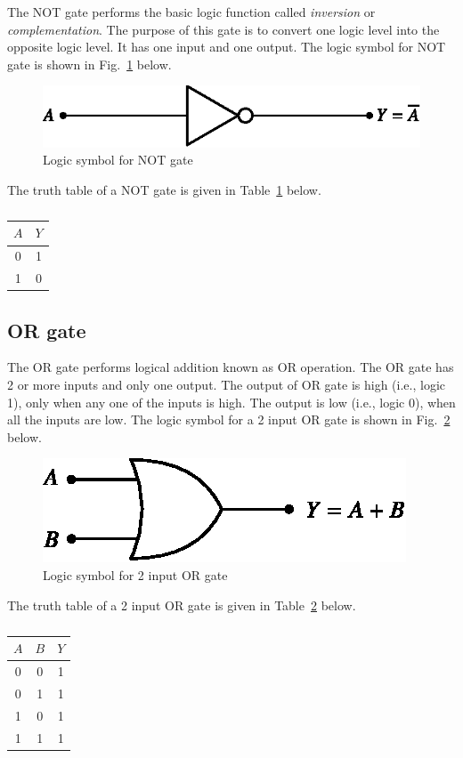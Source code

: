 The NOT gate performs the basic logic function called {\em inversion} or {\em complementation}. The purpose of this gate is to convert one logic level into the opposite logic level. It has one input and one output. The logic symbol for NOT gate is shown in Fig.~\ref{fig5.7} below.
\begin{figure}[H]
\centering
\includegraphics{chap5/fig5.8.eps}
\caption{Logic symbol for NOT gate}\label{fig5.7}
\end{figure}

The truth table of a NOT gate is given in Table~\ref{tab5.10} below.
\begin{table}[H]
\centering
\caption{}\label{tab5.10}
\tabcolsep=10pt
\begin{tabular}{|c|c|}
\hline
\boldmath$A$ & \boldmath$Y$\\
\hline
0 & 1\\
1 & 0\\
\hline
\end{tabular}
\end{table}

\subsection{OR gate}\label{sec5.14.1}

The OR gate performs logical addition known as OR operation. The OR gate has 2 or more inputs and only one output. The output of OR gate is high (i.e., logic 1), only when any one of the inputs is high. The output is low (i.e., logic 0), when all the inputs are low. The logic symbol for a 2 input OR gate is shown in Fig.~\ref{fig5.8} below.
\begin{figure}[H]
\centering
\includegraphics{chap5/fig5.9.eps}
\caption{Logic symbol for 2 input OR gate}\label{fig5.8}
\end{figure}

The truth table of a 2 input OR gate is given in Table~\ref{tab5.11} below.
\begin{table}[H]
\centering
\caption{}\label{tab5.11}
\tabcolsep=10pt
\begin{tabular}{|cc|c|}
\hline
\boldmath$A$ & \boldmath$B$ & \boldmath$Y$\\
\hline
0 & 0 & 1\\
0 & 1 & 1\\
1 & 0 & 1\\
1 & 1 & 1\\
\hline
\end{tabular}
\end{table}

